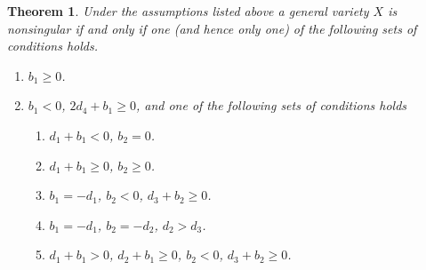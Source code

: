 \documentclass[12pt]{amsart}
\makeatletter
\newcommand{\symbitem}[1]{\item[#1]%
\renewcommand{\@currentlabel}{#1}\ignorespaces}
\newtheorem{theorem}[equation]{Theorem}
\theoremstyle{definition}
\theoremstyle{remark}
\makeatother
\begin{document}
\begin{theorem}\label{maintheorem}
Under the assumptions listed above a general variety $X$ 
is nonsingular if and only if one (and hence only one) of the following sets
of conditions holds.

\begin{enumerate}
\item\label{emp} $b_1\geqslant 0$.
\item\label{y5} $b_1<0$, $2d_4+b_1\geqslant 0$, and one of the following sets 
of conditions holds
\begin{enumerate}
\item%
\label{y5case1} $d_1+b_1<0$, $b_2=0$.
\item%
\label{y5case2} $d_1+b_1\geqslant 0$, $b_2\geqslant 0$.
\item%
\label{y5case3} $b_1=-d_1$, $b_2<0$, $d_3+b_2\geqslant 0$.
\item%
\label{y5case4} $b_1=-d_1$, $b_2=-d_2$, $d_2>d_3$.
\item%
\label{y5case5} $d_1+b_1>0$, $d_2+b_1\geqslant 0$, 
$b_2<0$, $d_3+b_2\geqslant 0$.
\end{enumerate}


\end{enumerate}
\end{theorem}
\end{document}
